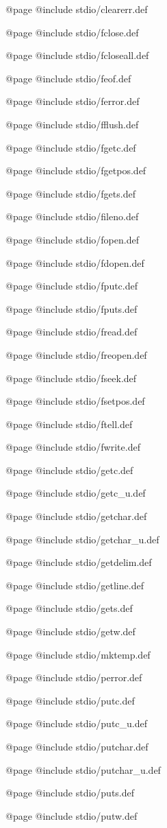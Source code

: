 @page
@include stdio/clearerr.def

@page
@include stdio/fclose.def

@page
@include stdio/fcloseall.def

@page
@include stdio/feof.def

@page
@include stdio/ferror.def

@page
@include stdio/fflush.def

@page 
@include stdio/fgetc.def 

@page
@include stdio/fgetpos.def

@page 
@include stdio/fgets.def 

@page
@include stdio/fileno.def

@page
@include stdio/fopen.def

@page
@include stdio/fdopen.def

@page
@include stdio/fputc.def

@page
@include stdio/fputs.def

@page
@include stdio/fread.def

@page
@include stdio/freopen.def

@page
@include stdio/fseek.def

@page
@include stdio/fsetpos.def

@page
@include stdio/ftell.def

@page
@include stdio/fwrite.def

@page 
@include stdio/getc.def 

@page
@include stdio/getc_u.def

@page
@include stdio/getchar.def 

@page
@include stdio/getchar_u.def

@page
@include stdio/getdelim.def

@page
@include stdio/getline.def

@page 
@include stdio/gets.def

@page 
@include stdio/getw.def 

@page
@include stdio/mktemp.def

@page
@include stdio/perror.def

@page
@include stdio/putc.def

@page
@include stdio/putc_u.def

@page
@include stdio/putchar.def

@page
@include stdio/putchar_u.def

@page
@include stdio/puts.def

@page 
@include stdio/putw.def 

